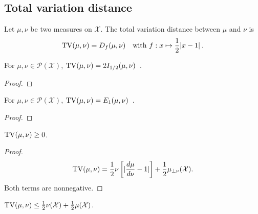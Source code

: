 \subsection{Total variation distance}

\begin{definition}[TV distance]
  \label{def:TV}
  \leanok
  Let $\mu, \nu$ be two measures on $\mathcal X$. The total variation distance between $\mu$ and $\nu$ is
  \begin{align*}
  \operatorname{TV}(\mu, \nu) = D_f(\mu, \nu) \quad \text{with } f: x \mapsto \frac{1}{2}\vert x - 1 \vert \: .
  \end{align*}
\end{definition}

\begin{lemma}
  \label{lem:TV_eq_deGrootInfo_half}
  For $\mu, \nu \in \mathcal P(\mathcal X)$, $\operatorname{TV}(\mu, \nu) = 2 I_{1/2}(\mu, \nu)$~.
\end{lemma}

\begin{proof}%
\uses{}

\end{proof}

\begin{lemma}
  \label{lem:TV_eq_eGamma_one}
  For $\mu, \nu \in \mathcal P(\mathcal X)$, $\operatorname{TV}(\mu, \nu) = E_1(\mu, \nu)$~.
\end{lemma}

\begin{proof}%
\uses{}

\end{proof}

\begin{lemma}
  \label{lem:tv_nonneg}
  $\operatorname{TV}(\mu, \nu) \ge 0$.
\end{lemma}

\begin{proof}
\begin{align*}
\operatorname{TV}(\mu, \nu)
= \frac{1}{2}\nu\left[ \vert \frac{d\mu}{d\nu} - 1 \vert \right] + \frac{1}{2}\mu_{\perp \nu}(\mathcal X).
\end{align*}
Both terms are nonnegative.
\end{proof}

\begin{lemma}
  \label{lem:tv_le_add}
  $\operatorname{TV}(\mu, \nu) \le \frac{1}{2}\nu(\mathcal X) + \frac{1}{2}\mu(\mathcal X)$.
\end{lemma}

